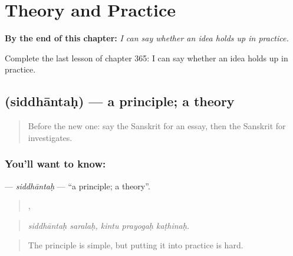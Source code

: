 
\chapter{Theory and Practice}
\label{ch:sa-theory-and-practice}

\begin{chapteropening}
\textbf{By the end of this chapter:} \emph{I can say whether an idea holds up in practice.}

Complete the last lesson of chapter 365: I can say whether an idea holds up in practice.
\end{chapteropening}

\section[\texorpdfstring{\sk{सिद्धान्तः} (siddhāntaḥ)}{सिद्धान्तः (siddhāntaḥ)}]{ (siddhāntaḥ) — a principle; a theory}

\label{lesson:SA-C365-siddhantah}



\begin{quote}
Before the new one: say the Sanskrit for an essay, then the Sanskrit for investigates.
\end{quote}

\subsection*{You'll want to know: }
\textbf{} — \emph{siddhāntaḥ} — \textquotedblleft{}a principle; a theory\textquotedblright{}.

\begin{quote}
 ,   
\end{quote}

\begin{quote}
\emph{siddhāntaḥ saralaḥ, kintu prayogaḥ kaṭhinaḥ.}
\end{quote}

\begin{quote}
The principle is simple, but putting it into practice is hard.
\end{quote}

